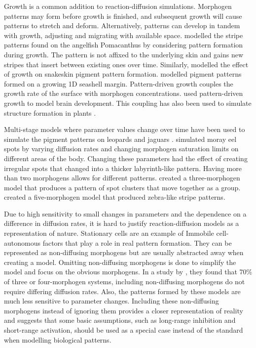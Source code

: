 Growth is a common addition to reaction-diffusion simulations. Morphogen patterns may form before growth is finished, and subsequent growth will cause patterns to stretch and deform. Alternatively, patterns can develop in tandem with growth, adjusting and migrating with available space. \citet{kondo1995} modelled the stripe patterns found on the angelfish Pomacanthus by considering pattern formation during growth. The pattern is not affixed to the underlying skin and gains new stripes that insert between existing ones over time. Similarly, \citet{murray1991} modelled the effect of growth on snakeskin pigment pattern formation. \citet{fowler1992} modelled pigment patterns formed on a growing 1D seashell margin. Pattern-driven growth couples the growth rate of the surface with morphogen concentrations. \citet{lefevre2010} used pattern-driven growth to model brain development. This coupling has also been used to simulate structure formation in plants \citep{harrison2002, holloway2007}.  

Multi-stage models where parameter values change over time have been used to simulate the pigment patterns on leopards and jaguars \citep{liu2006}. \citet{malheiros2017} simulated moray eel spots by varying diffusion rates and changing morphogen saturation limits on different areas of the body. Changing these parameters had the effect of creating irregular spots that changed into a thicker labyrinth-like pattern. Having more than two morphogens allows for different patterns. \citet{schenk2000} created a three-morphogen model that produces a pattern of spot clusters that move together as a group. \citet{meinhardt1982} created a five-morphogen model that produced zebra-like stripe patterns.

Due to high sensitivity to small changes in parameters and the dependence on a difference in diffusion rates, it is hard to justify reaction-diffusion models as a representation of nature. Stationary cells are an example of Immobile cell-autonomous factors that play a role in real pattern formation. They can be represented as non-diffusing morphogens but are usually abstracted away when creating a model. Omitting non-diffusing morphogens is done to simplify the model and focus on the obvious morphogens. In a study by \citet{marcon2016}, they found that 70\% of three or four-morphogen systems, including non-diffusing morphogens do not require differing diffusion rates. Also, the patterns formed by these models are much less sensitive to parameter changes. Including these non-diffusing morphogens instead of ignoring them provides a closer representation of reality and suggests that some basic assumptions, such as long-range inhibition and short-range activation, should be used as a special case instead of the standard when modelling biological patterns.


